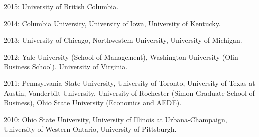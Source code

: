 \documentclass[10pt,letterpaper]{article}
\renewenvironment{itemize}{
  \begin{list}{}{
    \setlength{\leftmargin}{1.5em}
    \setlength{\itemsep}{0.25em}
    \setlength{\parskip}{0pt}
    \setlength{\parsep}{0.25em}
  }
}{
  \end{list}
}
\begin{document}
\begin{itemize}
\item 2015: University of British Columbia.
\item 2014: Columbia University, University of Iowa, University of Kentucky.
\item 2013: University of Chicago, Northwestern University, University of Michigan.
\item 2012: Yale University (School of Management), Washington University (Olin Business School), University of Virginia.
\item 2011: Pennsylvania State University, University of Toronto, University of Texas at Austin, Vanderbilt University, University of Rochester (Simon Graduate School of Business), Ohio State University (Economics and AEDE).
\item 2010: Ohio State University, University of Illinois at Urbana-Champaign, University of Western Ontario, University of Pittsburgh.
\end{itemize}

\end{document}
